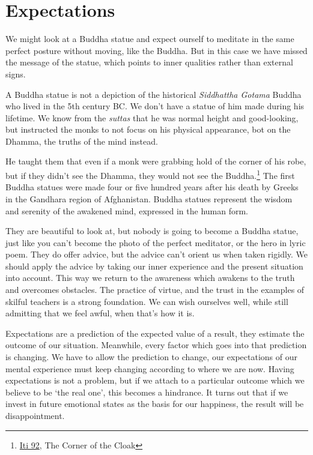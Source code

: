 \section{Expectations}


\noindent We might look at a Buddha statue and expect ourself to
meditate in the same perfect posture without moving, like the Buddha.
But in this case we have missed the message of the statue, which points
to inner qualities rather than external signs.

A Buddha statue is not a depiction of the historical \emph{Siddhattha
Gotama} Buddha who lived in the 5th century BC. We don't have a statue
of him made during his lifetime. We know from the \emph{suttas} that he
was normal height and good-looking, but instructed the monks to not
focus on his physical appearance, bot on the Dhamma, the truths of the
mind instead.

He taught them that even if a monk were grabbing hold of the corner of
his robe, but if they didn't see the Dhamma, they would not see the
Buddha.\footnote{\href{https://suttacentral.net/iti92}{Iti 92}, The
  Corner of the Cloak} The first Buddha statues were made four or five
hundred years after his death by Greeks in the Gandhara region of
Afghanistan. Buddha statues represent the wisdom and serenity of the
awakened mind, expressed in the human form.

They are beautiful to look at, but nobody is going to become a Buddha
statue, just like you can't become the photo of the perfect meditator,
or the hero in lyric poem. They do offer advice, but the advice can't
orient us when taken rigidly. We should apply the advice by taking our
inner experience and the present situation into account. This way we
return to the awareness which awakens to the truth and overcomes
obstacles. The practice of virtue, and the trust in the examples of
skilful teachers is a strong foundation. We can wish ourselves well,
while still admitting that we feel awful, when that's how it is.

Expectations are a prediction of the expected value of a result, they
estimate the outcome of our situation. Meanwhile, every factor which
goes into that prediction is changing. We have to allow the prediction
to change, our expectations of our mental experience must keep changing
according to where we are now. Having expectations is not a problem, but
if we attach to a particular outcome which we believe to be `the real
one', this becomes a hindrance. It turns out that if we invest in future
emotional states as the basis for our happiness, the result will be
disappointment.

